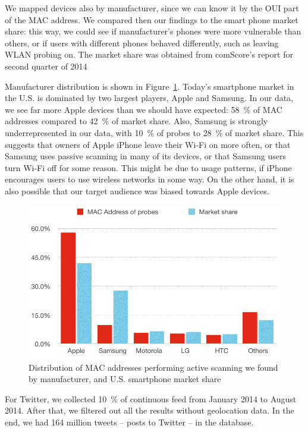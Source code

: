 \documentclass[12pt,a4paper,oneside,pdftex]{report}
\begin{document}
We mapped devices also by manufacturer, since we can know it by the OUI part of the MAC address. We compared then our findings to the smart phone market share: this way, we could see if manufacturer's phones were more vulnerable than others, or if users with different phones behaved differently, such as leaving WLAN probing on. The market share was obtained from comScore's report for second quarter of 2014~\cite{comscore2014}

Manufacturer distribution is shown in Figure~\ref{fig:manufacturers}. Today's smartphone market in the U.S. is dominated by two largest players, Apple and Samsung. In our data, we see far more Apple devices than we should have expected: 58~\% of MAC addresses compared to 42~\% of market share. Also, Samsung is strongly underrepresented in our data, with 10~\% of probes to 28~\% of market share. This suggests that owners of Apple iPhone leave their Wi-Fi on more often, or that Samsung uses passive scanning in many of its devices, or that Samsung users turn Wi-Fi off for some reason. This might be due to usage patterns, if iPhone encourages users to use wireless networks in some way. On the other hand, it is also possible that our target audience was biased towards Apple devices.

\begin{figure}
    \center
    \includegraphics{images/manufacturers}
    \caption{Distribution of MAC addresses performing active scanning we found by manufacturer, and U.S. smartphone market share\cite{comscore2014}}
    \label{fig:manufacturers}
\end{figure}

For Twitter, we collected 10~\% of continuous feed from January 2014 to August 2014. After that, we filtered out all the results without geolocation data. In the end, we had 164 million tweets -- posts to Twitter -- in the database.
\end{document}

